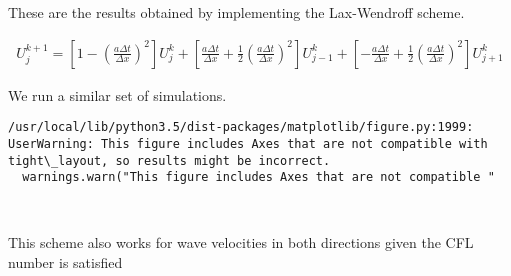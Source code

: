 \documentclass[11pt]{article}
\begin{document}
These are the results obtained by implementing the Lax-Wendroff scheme.

\begin{align}
U_j^{k+1} = \left[ 1-\left(\frac{a\Delta t}{\Delta x}\right)^2\right]U_j^k + 
\left[ \frac{a\Delta t}{\Delta x}+\frac{1}{2}\left(\frac{a\Delta t}{\Delta x}\right)^2\right]U_{j-1}^k + 
\left[ -\frac{a\Delta t}{\Delta x}+\frac{1}{2}\left(\frac{a\Delta t}{\Delta x}\right)^2\right]U_{j+1}^k
\end{align}

We run a similar set of simulations.

    \begin{Verbatim}[commandchars=\\\{\}]
/usr/local/lib/python3.5/dist-packages/matplotlib/figure.py:1999: UserWarning: This figure includes Axes that are not compatible with tight\_layout, so results might be incorrect.
  warnings.warn("This figure includes Axes that are not compatible "

    \end{Verbatim}

    \begin{center}
    \end{center}
    { \hspace*{\fill} \\}
    
    This scheme also works for wave velocities in both directions given the
CFL number is satisfied


    
    
    
    
\end{document}
